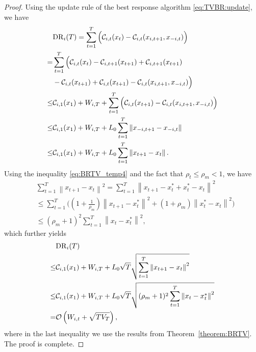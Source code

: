 \begin{proof}
Using the update rule of the best response algorithm \eqref{eq:TVBR:update}, we have 
\begin{align}
    &{\rm{DR}}_i(T) = \sum_{t=1}^T \Big( \mathcal{C}_{i,t}(x_t) -\mathcal{C}_{i,t}(x_{i,t+1},x_{-i,t})\Big) \nonumber \\
    =& \sum_{t=1}^T \Big( \mathcal{C}_{i,t}(x_t) - \mathcal{C}_{i,t+1}(x_{t+1}) + \mathcal{C}_{i,t+1}(x_{t+1}) \nonumber \\ 
    &- \mathcal{C}_{i,t}(x_{t+1}) + \mathcal{C}_{i,t}(x_{t+1}) - \mathcal{C}_{i,t}(x_{i,t+1},x_{-i,t}) \Big) \nonumber \\ 
    \leq & \mathcal{C}_{i,1}(x_1) +  W_{i,T} + \sum_{t=1}^T \Big(\mathcal{C}_{i,t}(x_{t+1}) - \mathcal{C}_{i,t}(x_{i,t+1},x_{-i,t}) \Big) \nonumber \\ 
    \leq & \mathcal{C}_{i,1}(x_1)+ W_{i,T} + L_0 \sum_{t=1}^T\left\| x_{-i,t+1}-x_{-i,t}\right\| \nonumber \\ 
    \leq & \mathcal{C}_{i,1}(x_1)+ W_{i,T} + L_0 \sum_{t=1}^T \left\| x_{t+1}-x_{t}\right\|.
\end{align}
%
Using the inequality \eqref{eq:BRTV_temp4} and the fact that $\rho_t \leq \rho_m <1$, we have
\begin{align*}
    &\sum_{t=1}^T\left\| x_{t+1}-x_{t}\right\|^2 =\sum_{t=1}^T\left\| x_{t+1}- x_t^{*} +x_t^{*} - x_{t}\right\|^2 \nonumber \\
    & \leq \sum_{t=1}^T \big( (1+\frac{1}{\rho_m}) \left\| x_{t+1}- x_t^{*}\right\|^2 + (1+\rho_m)  \left\|  x_t^{*} - x_{t}\right\|^2 \big) \nonumber \\
    & \leq (\rho_m+1)^2 \sum_{t=1}^T \left\|  x_{t} - x_t^{*} \right\|^2,
\end{align*}
which further yields
\begin{align}
    &{\rm{DR}}_i(T)  \nonumber \\
    \leq & \mathcal{C}_{i,1}(x_1)+ W_{i,T} + L_0 \sqrt{T} \sqrt{\sum_{t=1}^T \left\| x_{t+1}-x_{t}\right\|^2} \nonumber \\
    \leq &  \mathcal{C}_{i,1}(x_1)+ W_{i,T} + L_0 \sqrt{T} \sqrt{(\rho_m+1)^2 \sum_{t=1}^T \left\|  x_{t} - x_t^{*} \right\|^2} \nonumber \\
    =& \mathcal{O}\left( W_{i,t} +\sqrt{TV_T} \right),
\end{align}
where in the last inequality we use the results from Theorem~\ref{theorem:BRTV}.
The proof is complete.
\end{proof}

